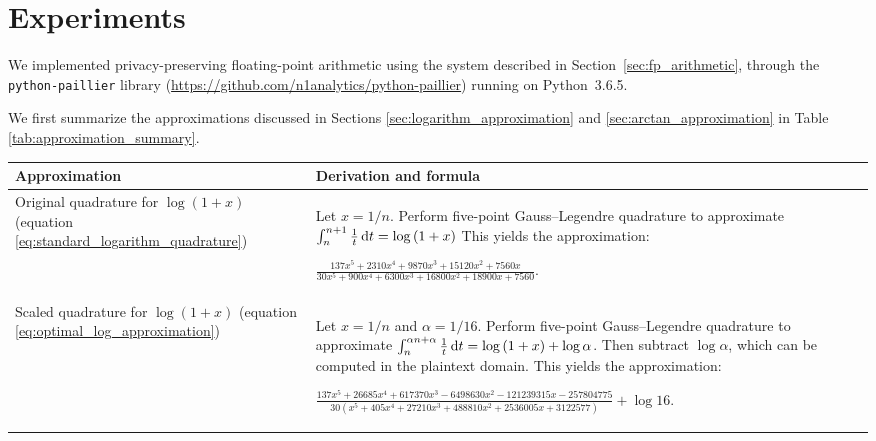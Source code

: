 \section{Experiments}
We implemented privacy-preserving floating-point arithmetic using the system described in Section~\ref{sec:fp_arithmetic}, through the \texttt{python-paillier} library (\url{https://github.com/n1analytics/python-paillier}) running on Python~3.6.5.

We first summarize the approximations discussed in Sections \ref{sec:logarithm_approximation} and \ref{sec:arctan_approximation} in Table \ref{tab:approximation_summary}.

\begin{table*}[ht]
	\caption{Summary of approximations for logarithm and inverse tangent}
	\label{tab:approximation_summary}
    \begin{tabular}{
        p{}
        p{}}
		\toprule
		Approximation & Derivation and formula\\
		\midrule
            Original quadrature for $\log\left(1+x\right)$ (equation \ref{eq:standard_logarithm_quadrature})
            & Let $x=1/n$. Perform five-point Gauss--Legendre quadrature to approximate $\int_{n}^{n+1}{\frac{1}{t}\mathop{}\!\mathrm{d} t} = \log\left(1+x\right)$ This yields the approximation:
            \begin{center}
                $\displaystyle 
            \frac{137x^5 + 2310x^4 + 9870x^3 + 15120x^2 + 7560x}
            {30x^5 + 900x^4 + 6300x^3 + 16800x^2 + 18900x + 7560}$.
            \end{center}
            \\[10pt]

            Scaled quadrature for $\log\left(1+x\right)$ (equation \ref{eq:optimal_log_approximation})
            & Let $x=1/n$ and $\alpha= 1/16$. Perform five-point Gauss--Legendre quadrature to approximate $\int_{n}^{\alpha n + \alpha}{\frac{1}{t}\mathop{}\!\mathrm{d} t} = \log\left(1+x\right) + \log\alpha$. 
            Then subtract $\log\alpha$, which can be computed in the plaintext domain. This yields the approximation:
            \begin{center}
            $\displaystyle 
            \frac{137x^5 + 26685x^4 + 617370x^3 - 6498630x^2 - 121239315x - 257804775}
            {30(x^5 + 405x^4 + 27210x^3 + 488810x^2 + 2536005x + 3122577)}
            + \log{16}$.
            \end{center}
            \\[10pt]
            

\end{tabular}
\end{table*}
